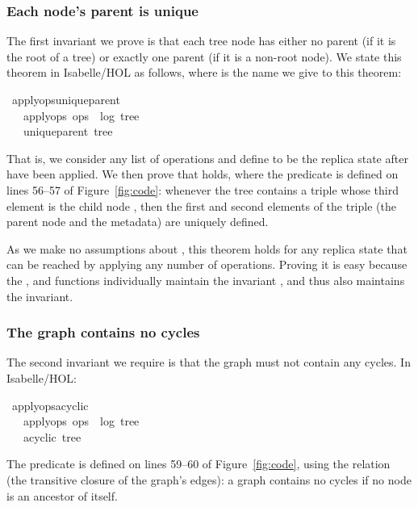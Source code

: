 \documentclass[sigplan,anonymous]{acmart}
\renewenvironment{isabelle}{%
  \medbreak\noindent%
  \renewcommand{\isanewline}{\\}%
  \begin{minipage}{\columnwidth}%
  \begin{isabellebody}%
  \begin{tabbing}%
}{%
  \end{tabbing}%
  \end{isabellebody}%
  \end{minipage}%
  \medbreak%
}
\renewcommand{\isacartoucheopen}{}
\renewcommand{\isacartoucheclose}{}
\begin{document}
\subsubsection{Each node's parent is unique}\label{sec:unique-parent}

The first invariant we prove is that each tree node has either no parent (if it is the root of a tree) or exactly one parent (if it is a non-root node).
We state this theorem in Isabelle/HOL as follows, where  is the name we give to this theorem:
\begin{isabelle}
\isamarkupfalse%
\ apply{\isacharunderscore}ops{\isacharunderscore}unique{\isacharunderscore}parent{\isacharcolon}\isanewline
\ \ \ {\isacartoucheopen}apply{\isacharunderscore}ops\ ops\ {\isacharequal}\ {\isacharparenleft}log{\isacharcomma}\ tree{\isacharparenright}{\isacartoucheclose}\isanewline
\ \ \ {\isacartoucheopen}unique{\isacharunderscore}parent\ tree{\isacartoucheclose}
\end{isabelle}
\noindent That is, we consider any list of operations  and define  to be the replica state after  have been applied.
We then prove that  holds, where the  predicate is defined on lines 56--57 of Figure~\ref{fig:code}: whenever the tree contains a triple whose third element is the child node , then the first and second elements of the triple (the parent node and the metadata) are uniquely defined.

As we make no assumptions about , this theorem holds for any replica state that can be reached by applying any number of operations.
Proving it is easy because the ,  and  functions individually maintain the invariant , and thus  also maintains the invariant.

\subsubsection{The graph contains no cycles}\label{sec:no-cycles}

The second invariant we require is that the graph must not contain any cycles.
In Isabelle/HOL:
\begin{isabelle}
\isamarkupfalse%
\ apply{\isacharunderscore}ops{\isacharunderscore}acyclic{\isacharcolon}\isanewline
\ \ \ {\isacartoucheopen}apply{\isacharunderscore}ops\ ops\ {\isacharequal}\ {\isacharparenleft}log{\isacharcomma}\ tree{\isacharparenright}{\isacartoucheclose}\isanewline
\ \ \ {\isacartoucheopen}acyclic\ tree{\isacartoucheclose}
\end{isabelle}
\noindent The  predicate is defined on lines 59--60 of Figure~\ref{fig:code}, using the  relation (the transitive closure of the graph's edges): a graph contains no cycles if no node is an ancestor of itself.
\end{document}

